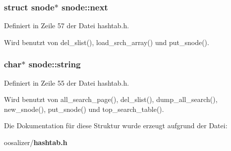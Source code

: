 \subsubsection{\setlength{\rightskip}{0pt plus 5cm}struct {\bf snode}$\ast$ {\bf snode::next}}\label{structsnode_91a76319ab431b979edd96540899a605}




Definiert in Zeile 57 der Datei hashtab.h.

Wird benutzt von del\_\-slist(), load\_\-srch\_\-array() und put\_\-snode().
\subsubsection{\setlength{\rightskip}{0pt plus 5cm}char$\ast$ {\bf snode::string}}\label{structsnode_4917005c761d2dfdb653d88a2eb5aa58}




Definiert in Zeile 55 der Datei hashtab.h.

Wird benutzt von all\_\-search\_\-page(), del\_\-slist(), dump\_\-all\_\-search(), new\_\-snode(), put\_\-snode() und top\_\-search\_\-table().

Die Dokumentation f\"{u}r diese Struktur wurde erzeugt aufgrund der Datei:\begin{CompactItemize}
\item 
oosalizer/{\bf hashtab.h}\end{CompactItemize}
